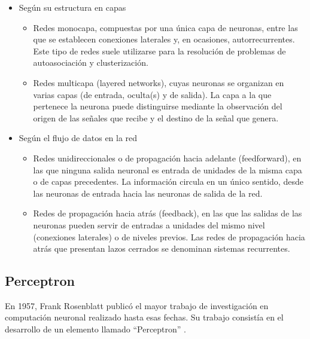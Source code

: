 \begin{itemize}
\item Según su estructura en capas
\begin{itemize}
  \item Redes monocapa, compuestas por una única capa de neuronas, entre las que se establecen conexiones laterales y, en ocasiones, autorrecurrentes. Este tipo de redes suele utilizarse para la resolución de problemas de autoasociación y clusterización.

  \item Redes multicapa (layered networks), cuyas neuronas se organizan en varias capas (de entrada, oculta(s) y de salida). La capa a la que pertenece la neurona puede distinguirse mediante la observación del origen de las señales que recibe y el destino de la señal que genera.
\end{itemize}

\item Según el flujo de datos en la red

\begin{itemize}
  \item Redes unidireccionales o de propagación hacia adelante (feedforward), en las que ninguna salida neuronal es entrada de unidades de la misma capa o de capas precedentes. La información circula en un único sentido, desde las neuronas de entrada hacia las neuronas de salida de la red.

  \item Redes de propagación hacia atrás (feedback), en las que las salidas de las neuronas pueden servir de entradas a unidades del mismo nivel (conexiones laterales) o de niveles previos. Las redes de propagación hacia atrás que presentan lazos cerrados se denominan sistemas recurrentes.
\end{itemize}
\end{itemize}
\subsection{Perceptron}
En 1957, Frank Rosenblatt publicó el mayor trabajo de investigación en computación neuronal realizado hasta esas fechas. Su trabajo consistía en el desarrollo de un
elemento llamado “Perceptron” \cite{olabe1998redes}.

